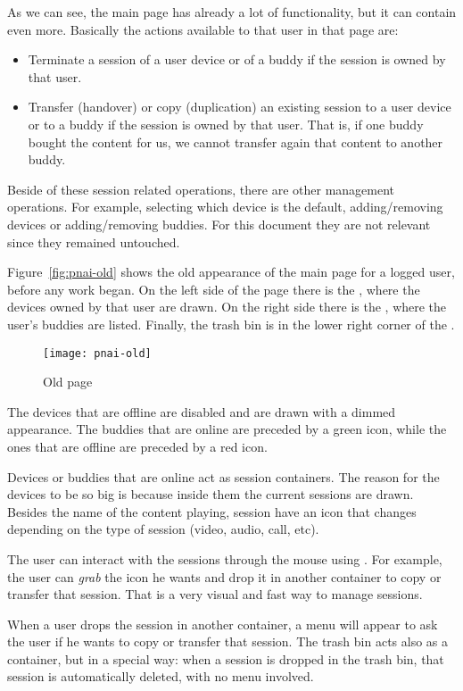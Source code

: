 As we can see, the main  page has already a lot of functionality, but it can contain even more. Basically the actions available to that user in that page are:

\begin{itemize}
  \item Terminate a session of a user device or of a buddy if the session is owned by that user.
  \item Transfer (handover) or copy (duplication) an existing session to a user device or to a buddy if the session is owned by that user. That is, if one buddy bought the content for us, we cannot transfer again that content to another buddy.
\end{itemize}

Beside of these session related operations, there are other management operations.
For example, selecting which device is the default, adding/removing devices or adding/removing buddies.
For this document they are not relevant since they remained untouched.

Figure~\vref{fig:pnai-old} shows the old appearance of the main page for a logged user, before any work began.
On the left side of the page there is the , where the devices owned by that user are drawn.
On the right side there is the , where the user's buddies are listed.
Finally, the trash bin is in the lower right corner of the . 

\begin{figure}[htbp]
  \centering
    \texttt{[image: pnai-old]}
  \caption{Old  page}
  \label{fig:pnai-old}
\end{figure}

The devices that are offline are disabled and are drawn with a dimmed appearance.
The buddies that are online are preceded by a green icon, while the ones that are offline are preceded by a red icon.

Devices or buddies that are online act as session containers.
The reason for the devices to be so big is because inside them the current sessions are drawn.
Besides the name of the content playing, session have an icon that changes depending on the type of session (video, audio, call, etc).

The user can interact with the sessions through the mouse using .
For example, the user can \emph{grab} the icon he wants and drop it in another container to copy or transfer that session.
That is a very visual and fast way to manage sessions.

When a user drops the session in another container, a menu will appear to ask the user if he wants to copy or transfer that session.
The trash bin acts also as a container, but in a special way: when a session is dropped in the trash bin, that session is automatically deleted, with no menu involved.







